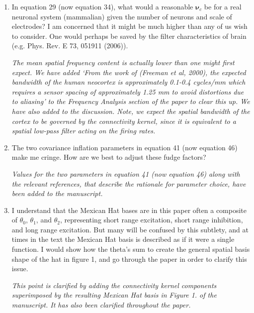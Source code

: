 \documentclass{article}
\begin{document}
\begin{enumerate}
\item In equation 29 (now equation 34), what would a reasonable $\boldsymbol{\nu}_c$ be for a real neuronal system (mammalian) given the number of neurons and scale of electrodes? I am concerned that it might be much higher than any of us wish to consider. One would perhaps be saved by the filter characteristics of brain (e.g. Phys. Rev. E 73, 051911 (2006)).

\emph{The mean spatial frequency content is actually lower than one might first expect. We have added `From the work of (Freeman et al, 2000), the expected bandwidth of the human neocortex is approximately 0.1-0.4 cycles/mm which requires a sensor spacing of approximately 1.25 mm to avoid distortions due to aliasing' to the Frequency Analysis section of the paper to clear this up. We have also added to the discussion. Note, we expect the spatial bandwidth of the cortex to be governed by the connectivity kernel, since it is equivalent to a spatial low-pass filter acting on the firing rates.}

\item The two covariance inflation parameters in equation 41 (now equation 46) make me cringe. How are we best to adjust these fudge factors?

\emph{Values for the two parameters in equation 41 (now equation 46) along with the relevant references, that describe the rationale for parameter choice, have been added to the manuscript.}

\item I understand that the Mexican Hat bases are in this paper often a composite of $\theta_0$, $\theta_1$, and $\theta_2$, representing short range excitation, short range inhibition, and long range excitation. But many will be confused by this subtlety, and at times in the text the Mexican Hat basis is described as if it were a single function. I would show how the theta's sum to create the general spatial basis shape of the hat in figure 1, and go through the paper in order to clarify this issue.

\emph{This point is clarified by adding the connectivity kernel components superimposed by the resulting Mexican Hat basis in Figure 1. of the manuscript. It has also been clarified throughout the paper.}


\end{enumerate}
\end{document}
